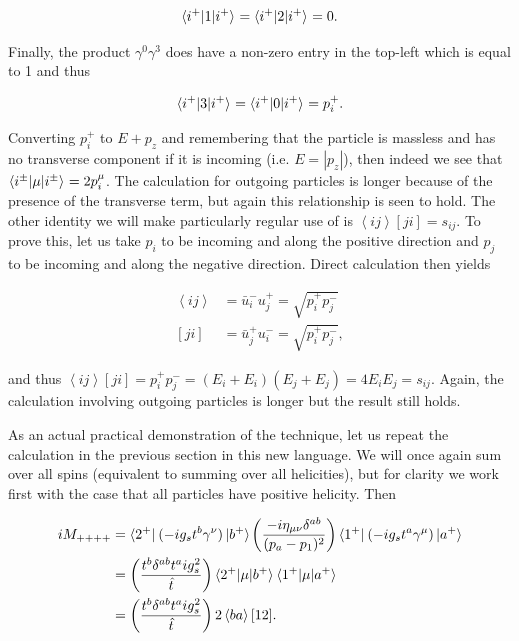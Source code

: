 \begin{equation}
\mathinner{\langle i^+\vert1\vert i^+\rangle}_{} = \mathinner{\langle i^+\vert2\vert i^+\rangle}_{} = 0.
\end{equation}

Finally, the product $\gamma^0 \gamma^3$ does have a non-zero entry in the top-left which is equal to 1 and thus

\begin{equation}
\mathinner{\langle i^+\vert3\vert i^+\rangle}_{} = \mathinner{\langle i^+\vert0\vert i^+\rangle}_{} =  p_i^+.
\end{equation}

Converting $p_i^+$ to $E + p_z$ and remembering that the particle is massless and has no transverse component if it is incoming (i.e. $E = |p_z|$), then indeed we see that $\mathinner{\langle i^\pm\vert\mu\vert i^\pm\rangle}_{} = 2p_i^\mu$. The calculation for outgoing particles is longer because of the presence of the transverse term, but again this relationship is seen to hold. The other identity we will make particularly regular use of is $\left<i j \right> [ji] = s_{ij}$. To prove this, let us take $p_i$ to be incoming and along the positive direction and $p_j$ to be incoming and along the negative direction. Direct calculation then yields

\begin{equation}
\begin{split}
\left< i j \right> &= \bar{u}_i^- u_j^+ = \sqrt{p_i^+ p_j^-} \\
[ j i] &= \bar{u}_j^+ u_i^- = \sqrt{p_i^+ p_j^-},
\end{split}
\end{equation}

and thus $\left<i j \right> [ji] = p_i^+ p_j^- = (E_i + E_i)(E_j + E_j) = 4 E_i E_j = s_{ij}$. Again, the calculation involving outgoing particles is longer but the result still holds. 

As an actual practical demonstration of the technique, let us repeat the calculation in the previous section in this new language. We will once again sum over all spins (equivalent to summing over all helicities), but for clarity we work first with the case that all particles have positive helicity. Then

\begin{equation}
\begin{split}
iM_{++++} &= \mathinner{\langle 2^+\rvert}_{}(-i g_s t^b \gamma^\nu) \mathinner{\lvert b^+\rangle}_{\hspace{-0.1em}} \left( \frac{- i \eta_{\mu \nu}\delta^{ab}}{(p_a - p_1)^2} \right)\mathinner{\langle 1^+\rvert}_{} (-i g_s t^a \gamma^\mu)\mathinner{\lvert a^+\rangle}_{\hspace{-0.1em}} \\
& = \left(\frac{t^b \delta^{ab} t^a i g_s^2}{\hat{t}} \right) \mathinner{\langle2^+\vert\mu\vert b^+\rangle}_{} \mathinner{\langle1^+\vert\mu\vert a^+\rangle}_{} \\
& = \left(\frac{t^b \delta^{ab} t^a i g_s^2}{\hat{t}} \right) 2 \left<b a \right> [1 2]. 
\end{split}
\end{equation}

